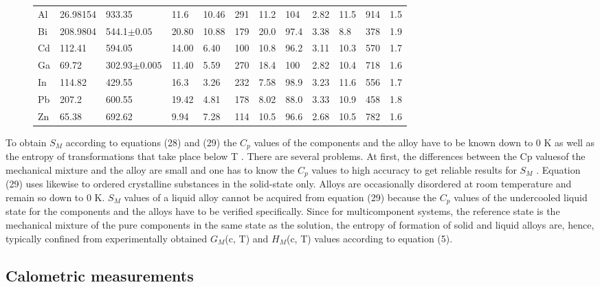\documentclass[12pt]{article}
\newcommand*{\1}{\hspace{1pt}}
\begin{document}
\begin{figure}
\begin{adjustwidth}{-1cm}{}
\begin{tabular}{|l | l | l | l | l | l | l | l | l | l | l | l|}
                
            \hline\hline
            Al & 26.98154 & 933.35           & 11.6  & 10.46 & 291 & 11.2 & 104  & 2.82 & 11.5 & 914 & 1.5 \\ 
            Bi & 208.9804 & 544.1$\pm 0.05$  & 20.80 & 10.88 & 179 & 20.0 & 97.4 & 3.38 & 8.8  & 378 & 1.9 \\
            Cd & 112.41   & 594.05           & 14.00 & 6.40  & 100 & 10.8 & 96.2 & 3.11 & 10.3 & 570 & 1.7 \\
            Ga & 69.72    & 302.93$\pm 0.005$& 11.40 & 5.59  & 270 & 18.4 & 100  & 2.82 & 10.4 & 718 & 1.6 \\
            In & 114.82   & 429.55           & 16.3  & 3.26  & 232 & 7.58 & 98.9 & 3.23 & 11.6 & 556 & 1.7 \\
            Pb & 207.2    & 600.55           & 19.42 & 4.81  & 178 & 8.02 & 88.0 & 3.33 & 10.9 & 458 & 1.8 \\
            Zn & 65.38    & 692.62           & 9.94  & 7.28  & 114 & 10.5 & 96.6 & 2.68 & 10.5 & 782 & 1.6 \\ [1ex] 
            \hline
            \end{tabular}
            \end{adjustwidth}
        \end{figure}


    To obtain $S _M$ according to equations (28) and (29) the $C _p$ values of the components and the
    alloy have to be known down to 0 K as well as the entropy of transformations that take
    place below T . There are several problems. At first, the differences between the Cp valuesof the mechanical mixture and the alloy are small and one has to know the $ C _p$ values to 
    high accuracy to get reliable results for $S _M$ . Equation (29) uses likewise to ordered
    crystalline substances in the solid-state only. Alloys are occasionally disordered at room
    temperature and remain so down to 0 K. $S _M$ values of a liquid alloy cannot be acquired from
    equation (29) because the $C _p $  values of the undercooled liquid state for the components and
    the alloys have to be verified specifically. Since for multicomponent systems, the reference 
    state is the mechanical mixture of the pure components in the same state as the solution,
    the entropy of formation of solid and liquid alloys are, hence, typically confined from
    experimentally obtained $ G _M$(c, T) and $ H _M $(c, T) values according to equation (5).


    \subsection{ Calometric measurements}
\end{document}
